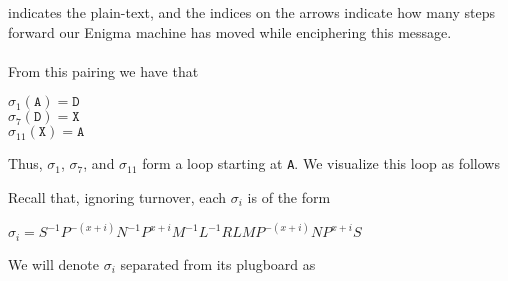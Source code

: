 indicates the plain-text,
and the indices on the arrows indicate how many steps forward our
Enigma machine has moved while enciphering this message.
\\\\From this pairing we have that
\begin{center}
  $\sigma_1(\texttt{A}) = {\texttt{D}}$\\
  $\sigma_7(\texttt{D}) = {\texttt{X}}$\\
  $\sigma_{11}(\texttt{X}) = {\texttt{A}}$\\
\end{center}
Thus, $\sigma_1$, $\sigma_7$, and $\sigma_{11}$ form a loop starting
at \texttt{A}. We visualize this loop as follows
\begin{center}
\end{center}
Recall that, ignoring turnover, each $\sigma_i$ is of the form
\begin{center}
  $\sigma_i = S^{-1}P^{-(x+i)}N^{-1}P^{x+i}M^{-1}L^{-1}RLMP^{-(x+i)}NP^{x+i}S$
\end{center}
We will denote $\sigma_i$ separated from its plugboard as
